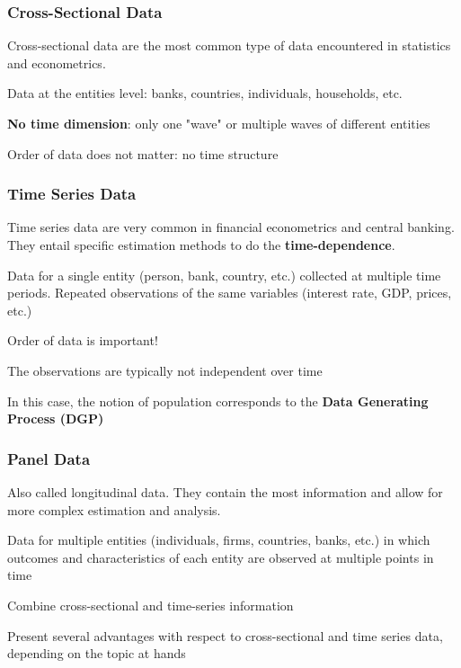 \documentclass{beamer}
\newenvironment{wideitemize}{\itemize\addtolength{\itemsep}{10pt}}{\enditemize}
\begin{document}
\begin{frame}
  \frametitle{Cross-Sectional Data}
  Cross-sectional data are the most common type of data encountered in statistics and econometrics.\\ 
  \smallskip
  
  \begin{wideitemize}
    \item Data at the entities level: banks, countries, individuals, households, etc.
    \item \textbf{No time dimension}: only one "wave" or multiple waves of different entities
    \item Order of data does not matter: no time structure
  \end{wideitemize}
\end{frame}


\begin{frame}
  \frametitle{Time Series Data}

  Time series data are very common in financial econometrics and central banking. They entail specific estimation methods to do the \textbf{time-dependence}.\\
  
  \begin{wideitemize}
    \item Data for a single entity (person, bank, country, etc.) collected at multiple time periods. Repeated observations of the same variables (interest rate, GDP, prices, etc.)
    \item Order of data is important!
    \item The observations are typically not independent over time
    \item In this case, the notion of population corresponds to the \textbf{Data Generating Process (DGP)} 
  \end{wideitemize}  
\end{frame}


\begin{frame}
  \frametitle{Panel Data}
  Also called longitudinal data. They contain the most information and allow for more complex estimation and analysis.

  \begin{wideitemize}
    \item Data for multiple entities (individuals, firms, countries, banks, etc.) in which outcomes and characteristics of each entity are observed at multiple points in time
    \item Combine cross-sectional and time-series information
    \item Present several advantages with respect to cross-sectional and time series data, depending on the topic at hands
  \end{wideitemize}

\end{frame}
\end{document}
